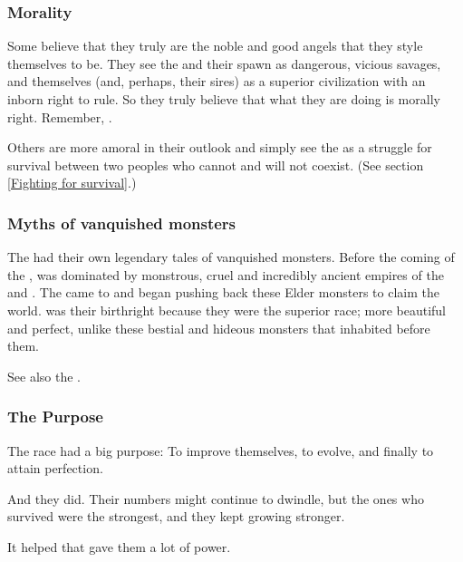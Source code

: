 \subsubsection{Morality}
Some \resphain{} believe that they truly are the noble and good angels that they style themselves to be. They see the \dragons{} and their spawn as dangerous, vicious savages, and themselves (and, perhaps, their \SitraAchra sires) as a superior civilization with an inborn right to rule. So they truly believe that what they are doing is morally right. Remember, .

Others are more amoral in their outlook and simply see the \secretwar{} as a struggle for survival between two peoples who cannot and will not coexist. (See section \ref{Fighting for survival}.)





\subsubsection{Myths of vanquished monsters}
The \resphain had their own legendary tales of vanquished monsters. 
Before the coming of the \resphain, \Miith was dominated by monstrous, cruel and incredibly ancient empires of the \dragons and \ophidians. 
The \resphain came to \Miith and began pushing back these Elder monsters to claim the world.
\Miith was their birthright because they were the superior race; more beautiful and perfect, unlike these bestial and hideous monsters that inhabited \Miith before them. 

See also the . 





\subsubsection{The Purpose}
The \resphan{} race had a big purpose: 
To improve themselves, to evolve, and finally to attain perfection. 

And they did. 
Their numbers might continue to dwindle, but the ones who survived were the strongest, and they kept growing stronger. 

It helped that \iquin{} gave them a lot of power. 


